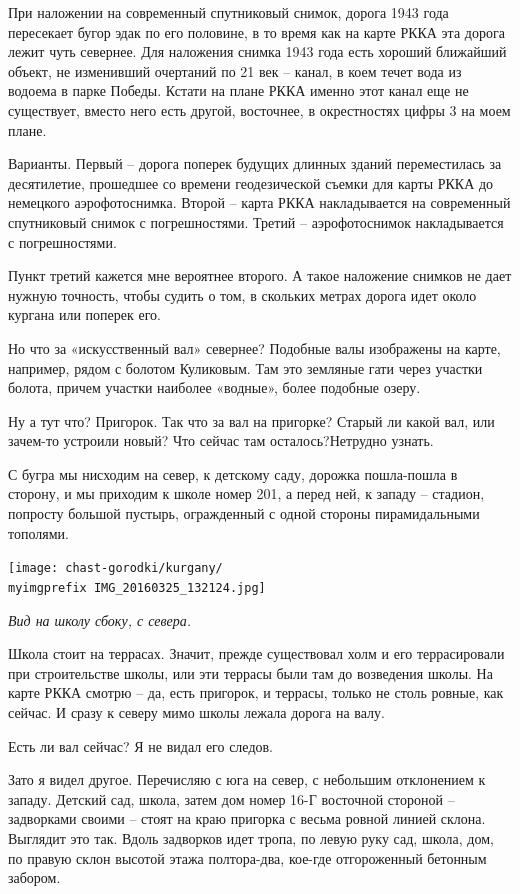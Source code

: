 При наложении на современный спутниковый снимок, дорога 1943 года пересекает бугор эдак по его половине, в то время как на карте РККА эта дорога лежит чуть севернее. Для наложения снимка 1943 года есть хороший ближайший объект, не изменивший очертаний по 21 век – канал, в коем течет вода из водоема в парке Победы. Кстати на плане РККА именно этот канал еще не существует, вместо него есть другой, восточнее, в окрестностях цифры 3 на моем плане.

Варианты. Первый – дорога поперек будущих длинных зданий переместилась за десятилетие, прошедшее со времени геодезической съемки для карты РККА до немецкого аэрофотоснимка. Второй – карта РККА накладывается на современный спутниковый снимок с погрешностями. Третий – аэрофотоснимок накладывается с погрешностями.

Пункт третий кажется мне вероятнее второго. А такое наложение снимков не дает нужную точность, чтобы судить о том, в скольких метрах дорога идет около кургана или поперек его.

Но что за «искусственный вал» севернее? Подобные валы изображены на карте, например, рядом с болотом Куликовым. Там это земляные гати через участки болота, причем участки наиболее «водные», более подобные озеру.

Ну а тут что? Пригорок. Так что за вал на пригорке? Старый ли какой вал, или зачем-то устроили новый? Что сейчас там осталось?Нетрудно узнать.

С бугра мы нисходим на север, к детскому саду, дорожка пошла-пошла в сторону, и мы приходим к школе номер 201, а перед ней, к западу – стадион, попросту большой пустырь, огражденный с одной стороны пирамидальными тополями.

\begin{center}
\texttt{[image: chast-gorodki/kurgany/\\myimgprefix IMG\_20160325\_132124.jpg]}

\textit{Вид на школу сбоку, с севера.}
\end{center}

Школа стоит на террасах. Значит, прежде существовал холм и его террасировали при строительстве школы, или эти террасы были там до возведения школы. На карте РККА смотрю – да, есть пригорок, и террасы, только не столь ровные, как сейчас. И сразу к северу мимо школы лежала дорога на валу. 

Есть ли вал сейчас? Я не видал его следов.

Зато я видел другое. Перечисляю с юга на север, с небольшим отклонением к западу. Детский сад, школа, затем дом номер 16-Г восточной стороной – задворками своими – стоят на краю пригорка с весьма ровной линией склона. Выглядит это так.  Вдоль задворков идет тропа, по левую руку сад, школа, дом, по правую склон высотой этажа полтора-два, кое-где отгороженный бетонным забором.

